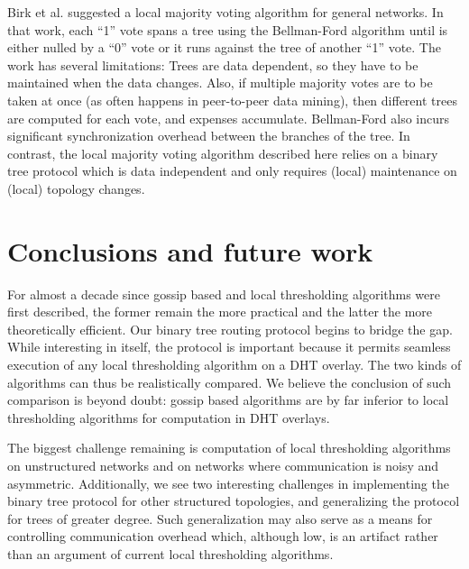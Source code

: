 \documentclass[12pt,english,journal]{elsarticle}
\numberwithin{equation}{section}
\numberwithin{figure}{section}
\theoremstyle{plain}
\theoremstyle{plain}
\begin{document}
Birk et al. \citep{ChargeFusion} suggested a local majority voting
algorithm for general networks. In that work, each ``1'' vote spans
a tree using the Bellman-Ford algorithm until is either nulled by
a ``0'' vote or it runs against the tree of another ``1'' vote.
The work has several limitations: Trees are data dependent, so they
have to be maintained when the data changes. Also, if multiple majority
votes are to be taken at once (as often happens in peer-to-peer data
mining), then different trees are computed for each vote, and expenses
accumulate. Bellman-Ford also incurs significant synchronization overhead
between the branches of the tree. In contrast, the local majority
voting algorithm described here relies on a binary tree protocol which
is data independent and only requires (local) maintenance on (local)
topology changes. 


\section{\label{sec:Conclusions}Conclusions and future work}

For almost a decade since gossip based and local thresholding algorithms
were first described, the former remain the more practical and the
latter the more theoretically efficient. Our binary tree routing protocol
begins to bridge the gap. While interesting in itself, the protocol
is important because it permits seamless execution of any local thresholding
algorithm on a DHT overlay. The two kinds of algorithms can thus be
realistically compared. We believe the conclusion of such comparison
is beyond doubt: gossip based algorithms are by far inferior to local
thresholding algorithms for computation in DHT overlays.

The biggest challenge remaining is computation of local thresholding
algorithms on unstructured networks and on networks where communication
is noisy and asymmetric. Additionally, we see two interesting challenges
in implementing the binary tree protocol for other structured topologies,
and generalizing the protocol for trees of greater degree. Such generalization
may also serve as a means for controlling communication overhead which,
although low, is an artifact rather than an argument of current local
thresholding algorithms.





\appendix
\end{document}
